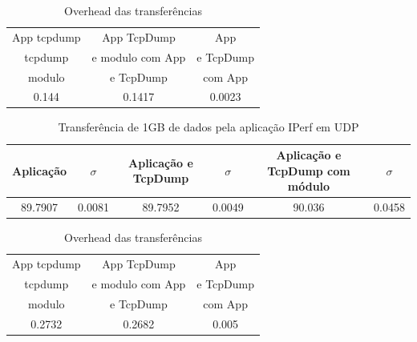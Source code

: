 \documentclass[a4paper]{llncs}
\begin{document}
\begin{table}
\begin{center}
\caption{Overhead das transferências}
\begin{tabular}{ | c | c | c  | }
\hline
\hspace {1cm} App tcpdump \hspace {1cm}  & \hspace{1cm} App TcpDump  \hspace{1cm} & \hspace{1cm} App \hspace{1cm}  \\
tcpdump & e modulo com App & e TcpDump\\
modulo & e TcpDump & com App \\
\hline
0.144 & 
0.1417 & 
0.0023 \\
\hline
\end{tabular}
\end{center}
\end{table}

\begin{table}
\begin{center}
\caption{Transferência de 1GB de dados pela aplicação IPerf em UDP}
\begin{tabular}{ | c | c | c |c | c | c | }
\hline
Aplicação & $\sigma$ & Aplicação e TcpDump & $\sigma$ & Aplicação e TcpDump com módulo &  $\sigma$ \\
\hline
89.7907 & 0.0081 &
89.7952	& 0.0049 &
90.036	& 0.0458 \\
\hline
\end{tabular}
\end{center}
\end{table}


\begin{table}
\begin{center}
\caption{Overhead das transferências}
\begin{tabular}{ | c | c | c  | }
\hline
\hspace {1cm} App tcpdump \hspace {1cm}  & \hspace{1cm} App TcpDump  \hspace{1cm} & \hspace{1cm} App \hspace{1cm}  \\
tcpdump & e modulo com App & e TcpDump\\
modulo & e TcpDump & com App \\
\hline
0.2732 & 
0.2682 & 
0.005 \\
\hline
\end{tabular}
\end{center}
\end{table}
\end{document}
